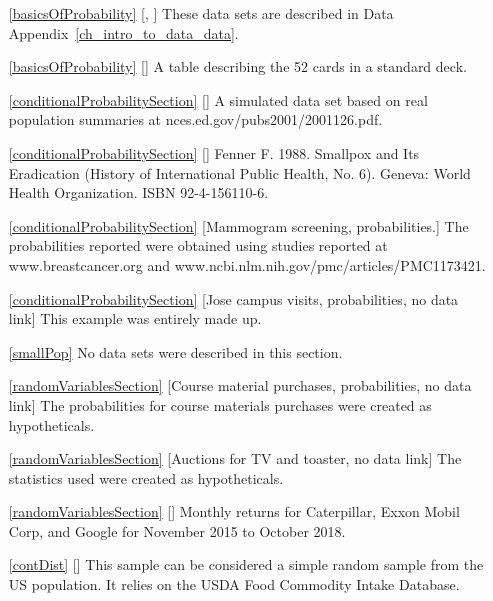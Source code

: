\begin{itemize}
\item[\ref{basicsOfProbability}]
    [\datalink{loan50}, \datalink{county}]
    These data sets are described in
    Data Appendix~\ref{ch_intro_to_data_data}.
\item[\ref{basicsOfProbability}]
    [\datalink{playing\_cards}]
    A table describing the 52 cards in a standard deck.

\item[\ref{conditionalProbabilitySection}]
    [\datalink{family\_college}]
    A simulated data set based on real population summaries at
        {nces.ed.gov/pubs2001/2001126.pdf}.
\item[\ref{conditionalProbabilitySection}]
    [\datalink{smallpox}]
    Fenner F. 1988.
    Smallpox and Its Eradication
    (History of International Public Health, No. 6).
    Geneva: World Health Organization. ISBN 92-4-156110-6.

\item[\ref{conditionalProbabilitySection}]
    [Mammogram screening, probabilities.]
    The probabilities reported were obtained using studies
    reported at
        {www.breastcancer.org}
    and 
        {www.ncbi.nlm.nih.gov/pmc/articles/PMC1173421}. 

\item[\ref{conditionalProbabilitySection}]
    [Jose campus visits, probabilities, no data link]
    This example was entirely made up.

\item[\ref{smallPop}]
    No data sets were described in this section.

\item[\ref{randomVariablesSection}]
    [Course material purchases, probabilities, no data link]
    The probabilities for course materials purchases were
    created as hypotheticals.

\item[\ref{randomVariablesSection}]
    [Auctions for TV and toaster, no data link]
    The statistics used were created as hypotheticals.

\item[\ref{randomVariablesSection}]
    [\datalink{stocks\_18}]
    Monthly returns for Caterpillar, Exxon Mobil Corp,
    and Google for November 2015 to October 2018.

\item[\ref{contDist}]
    [\datalink{fcid}]
    This sample can be considered a simple random sample
    from the US population.
    It relies on the USDA Food Commodity Intake Database.

\end{itemize}





